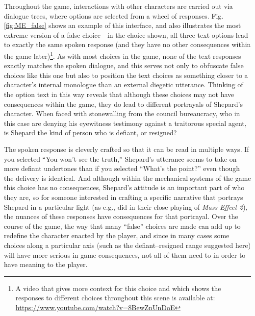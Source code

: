 \documentclass[arts,article,submit,moreauthors,pdftex,10pt,a4paper]{Definitions/mdpi}
\begin{document}
Throughout the game, interactions with other characters are carried out via dialogue trees, where options are selected from a wheel of responses.
%
Fig. \ref{fig:ME_false} shows an example of this interface, and also illustrates the most extreme version of a false choice---in the choice shown, all three text options lead to exactly the same spoken response (and they have no other consequences within the game later)\footnote{A video that gives more context for this choice and which shows the responses to different choices throughout this scene is available at: \url{https://www.youtube.com/watch?v=8BewZnUnDoE}}.
%
As with most choices in the game, none of the text responses exactly matches the spoken dialogue, and this serves not only to obfuscate false choices like this one but also to position the text choices as something closer to a character's internal monologue than an external diegetic utterance.
%
Thinking of the option text in this way reveals that although these choices may not have consequences within the game, they do lead to different portrayals of Shepard's character.
%
When faced with stonewalling from the council bureaucracy, who in this case are denying his eyewitness testimony against a traitorous special agent, is Shepard the kind of person who is defiant, or resigned?


The spoken response is cleverly crafted so that it can be read in multiple ways.
%
If you selected ``You won't see the truth,'' Shepard's utterance seems to take on more defiant undertones than if you selected ``What's the point?'' even though the delivery is identical.
%
And although within the mechanical systems of the game this choice has no consequences, Shepard's attitude is an important part of who they are, so for someone interested in crafting a specific narrative that portrays Shepard in a particular light (as e.g., \cite{bizzocchi2012mass} did in their close playing of \emph{Mass Effect 2}), the nuances of these responses have consequences for that portrayal.
%
Over the course of the game, the way that many ``false'' choices are made can add up to redefine the character enacted by the player, and since in many cases some choices along a particular axis (such as the defiant--resigned range suggested here) will have more serious in-game consequences, not all of them need to in order to have meaning to the player.
\end{document}
